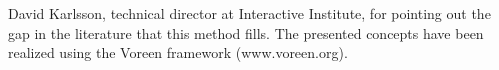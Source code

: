 \documentclass{egpubl}
\begin{document}
David Karlsson, technical director at Interactive Institute, for pointing out the gap in the literature that this method fills. The presented concepts have been realized using the Voreen framework (www.voreen.org).

%



\begin{figure}[p]
	\centering
\end{figure}
\end{document}
